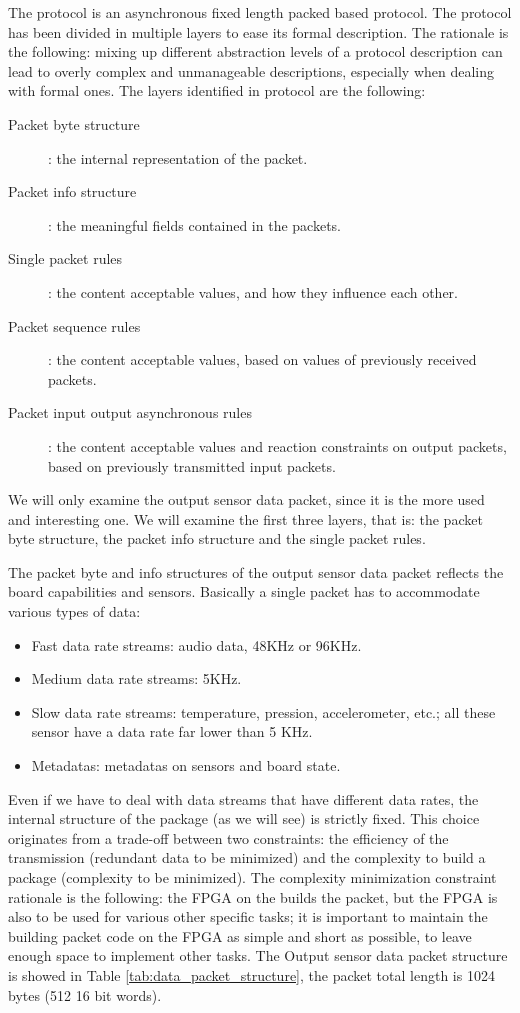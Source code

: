 \documentclass{article} \usepackage{times}
\begin{document}
The protocol is an asynchronous fixed length packed based protocol.
The protocol has been divided in multiple layers to ease its formal
description.  The rationale is the following: mixing up different
abstraction levels of a protocol description can lead to overly
complex and unmanageable descriptions, especially when dealing with
formal ones.  The layers identified in protocol are the following:

\begin{description}
\item[Packet byte structure]: the internal representation of the
  packet.
\item[Packet info structure]: the meaningful fields contained in the
  packets.
\item[Single packet rules]: the content acceptable values, and how
  they influence each other.
\item[Packet sequence rules]: the content acceptable values, based on
  values of previously received packets.
\item[Packet input output asynchronous rules]: the content acceptable
  values and reaction constraints on output packets, based on
  previously transmitted input packets.
\end{description}

We will only examine the output sensor data packet, since it is the
more used and interesting one.  We will examine the first three
layers, that is: the packet byte structure, the packet info structure
and the single packet rules.

The packet byte and info structures of the output sensor data packet
reflects the board capabilities and sensors.  Basically a single
packet has to accommodate various types of data:
\begin{itemize}
\item Fast data rate streams: audio data, 48KHz or 96KHz.
\item Medium data rate streams: 5KHz.
\item Slow data rate streams: temperature, pression, accelerometer,
  etc.; all these sensor have a data rate far lower than 5 KHz.
\item Metadatas: metadatas on sensors and board state.
\end{itemize}

Even if we have to deal with data streams that have different data
rates, the internal structure of the package (as we will see) is
strictly fixed.  This choice originates from a trade-off between two
constraints: the efficiency of the transmission (redundant data to be
minimized) and the complexity to build a package (complexity to be
minimized).  The complexity minimization constraint rationale is the
following: the FPGA on the \STSB builds the packet, but the FPGA is
also to be used for various other specific tasks; it is important to
maintain the building packet code on the FPGA as simple and short as
possible, to leave enough space to implement other tasks.  The Output
sensor data packet structure is showed in Table
\ref{tab:data_packet_structure}, the packet total length is 1024 bytes
(512 16 bit words).
\end{document}
